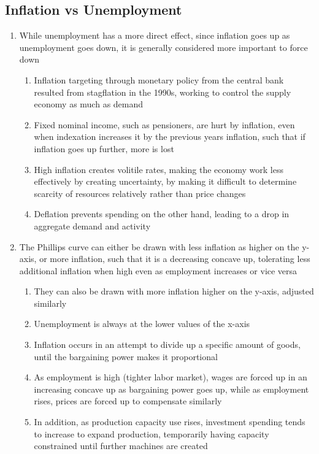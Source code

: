 \documentclass[11 pt, twoside]{article}
\begin{document}
\subsection{Inflation vs Unemployment}
\begin{enumerate}
\item While unemployment has a more direct effect, since inflation goes up as unemployment goes down, it is generally considered more important to force down
\begin{enumerate}
\item Inflation targeting through monetary policy from the central bank resulted from stagflation in the 1990s, working to control the supply economy as much as demand
\item Fixed nominal income, such as pensioners, are hurt by inflation, even when indexation increases it by the previous years inflation, such that if inflation goes up further, more is lost
\item High inflation creates volitile rates, making the economy work less effectively by creating uncertainty, by making it difficult to determine scarcity of resources relatively rather than price changes
\item Deflation prevents spending on the other hand, leading to a drop in aggregate demand and activity
\end{enumerate}
\item The Phillips curve can either be drawn with less inflation as higher on the y-axis, or more inflation, such that it is a decreasing concave up, tolerating less additional inflation when high even as employment increases or vice versa
\begin{enumerate}
\item They can also be drawn with more inflation higher on the y-axis, adjusted similarly
\item Unemployment is always at the lower values of the x-axis
\item Inflation occurs in an attempt to divide up a specific amount of goods, until the bargaining power makes it proportional
\item As employment is high (tighter labor market), wages are forced up in an increasing concave up  as bargaining power goes up, while as employment rises, prices are forced up to compensate similarly
\item In addition, as production capacity use rises, investment spending tends to increase to expand production, temporarily having capacity constrained until further machines are created

\end{enumerate}
\end{enumerate}
\end{document}
